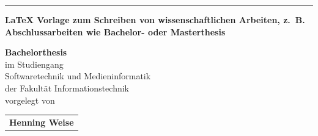 \noindent\rule[1ex]{\textwidth}{1pt}
    \vspace*{10pt}
    {\let\newpage\relax}
    
    
\begin{center}
\thispagestyle{empty}
    \Large{\textbf{LaTeX Vorlage zum Schreiben von wissenschaftlichen Arbeiten, z. B. Abschlussarbeiten wie Bachelor- oder Masterthesis}}
    
    \vspace{6ex}
    
        \begin{Large}  
            \textbf{Bachelorthesis}\\
            \vspace{6ex}
            im Studiengang\\
            Softwaretechnik und Medieninformatik\\
            der Fakultät Informationstechnik\\
            
            
            \vspace{8ex}
            vorgelegt von\\
            \begin{tabular}{l}
                \Large{\textbf{Henning Weise}}
            \end{tabular}
        \end{Large}
\end{center}